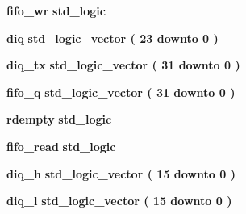 \begin{DoxyCompactItemize}
\item 
{\bf fifo\+\_\+wr} {\bfseries \textcolor{comment}{std\+\_\+logic}\textcolor{vhdlchar}{ }} 
\item 
{\bf diq} {\bfseries \textcolor{comment}{std\+\_\+logic\+\_\+vector}\textcolor{vhdlchar}{ }\textcolor{vhdlchar}{(}\textcolor{vhdlchar}{ }\textcolor{vhdlchar}{ } \textcolor{vhdldigit}{23} \textcolor{vhdlchar}{ }\textcolor{keywordflow}{downto}\textcolor{vhdlchar}{ }\textcolor{vhdlchar}{ } \textcolor{vhdldigit}{0} \textcolor{vhdlchar}{ }\textcolor{vhdlchar}{)}\textcolor{vhdlchar}{ }} 
\item 
{\bf diq\+\_\+tx} {\bfseries \textcolor{comment}{std\+\_\+logic\+\_\+vector}\textcolor{vhdlchar}{ }\textcolor{vhdlchar}{(}\textcolor{vhdlchar}{ }\textcolor{vhdlchar}{ } \textcolor{vhdldigit}{31} \textcolor{vhdlchar}{ }\textcolor{keywordflow}{downto}\textcolor{vhdlchar}{ }\textcolor{vhdlchar}{ } \textcolor{vhdldigit}{0} \textcolor{vhdlchar}{ }\textcolor{vhdlchar}{)}\textcolor{vhdlchar}{ }} 
\item 
{\bf fifo\+\_\+q} {\bfseries \textcolor{comment}{std\+\_\+logic\+\_\+vector}\textcolor{vhdlchar}{ }\textcolor{vhdlchar}{(}\textcolor{vhdlchar}{ }\textcolor{vhdlchar}{ } \textcolor{vhdldigit}{31} \textcolor{vhdlchar}{ }\textcolor{keywordflow}{downto}\textcolor{vhdlchar}{ }\textcolor{vhdlchar}{ } \textcolor{vhdldigit}{0} \textcolor{vhdlchar}{ }\textcolor{vhdlchar}{)}\textcolor{vhdlchar}{ }} 
\item 
{\bf rdempty} {\bfseries \textcolor{comment}{std\+\_\+logic}\textcolor{vhdlchar}{ }} 
\item 
{\bf fifo\+\_\+read} {\bfseries \textcolor{comment}{std\+\_\+logic}\textcolor{vhdlchar}{ }} 
\item 
{\bf diq\+\_\+h} {\bfseries \textcolor{comment}{std\+\_\+logic\+\_\+vector}\textcolor{vhdlchar}{ }\textcolor{vhdlchar}{(}\textcolor{vhdlchar}{ }\textcolor{vhdlchar}{ } \textcolor{vhdldigit}{15} \textcolor{vhdlchar}{ }\textcolor{keywordflow}{downto}\textcolor{vhdlchar}{ }\textcolor{vhdlchar}{ } \textcolor{vhdldigit}{0} \textcolor{vhdlchar}{ }\textcolor{vhdlchar}{)}\textcolor{vhdlchar}{ }} 
\item 
{\bf diq\+\_\+l} {\bfseries \textcolor{comment}{std\+\_\+logic\+\_\+vector}\textcolor{vhdlchar}{ }\textcolor{vhdlchar}{(}\textcolor{vhdlchar}{ }\textcolor{vhdlchar}{ } \textcolor{vhdldigit}{15} \textcolor{vhdlchar}{ }\textcolor{keywordflow}{downto}\textcolor{vhdlchar}{ }\textcolor{vhdlchar}{ } \textcolor{vhdldigit}{0} \textcolor{vhdlchar}{ }\textcolor{vhdlchar}{)}\textcolor{vhdlchar}{ }} 
\end{DoxyCompactItemize}

